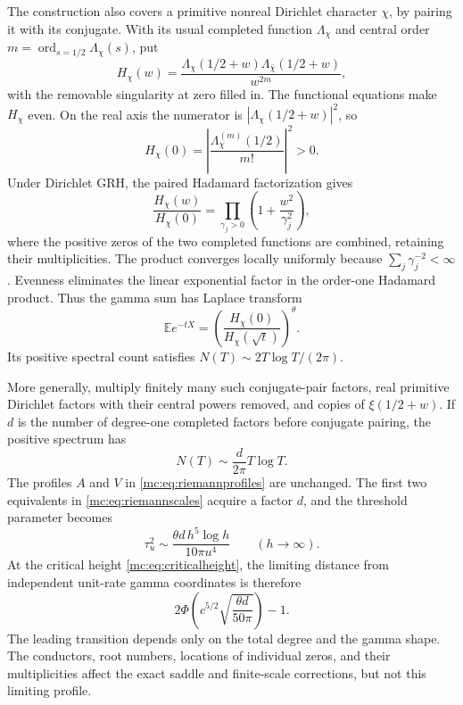 The construction also covers a primitive nonreal Dirichlet character
$\chi$, by pairing it with its conjugate.  With its usual completed
function $\Lambda_\chi$ and central order
$m=\operatorname{ord}_{s=1/2}\Lambda_\chi(s)$, put
\begin{equation}\label{mc:eq:complexproduct}
 H_\chi(w)=
 \frac{\Lambda_\chi(1/2+w)\Lambda_{\bar\chi}(1/2+w)}{w^{2m}},
\end{equation}
with the removable singularity at zero filled in.  The functional
equations make $H_\chi$ even.  On the real axis the numerator is
$|\Lambda_\chi(1/2+w)|^2$, so
\[
 H_\chi(0)=\left|\frac{\Lambda_\chi^{(m)}(1/2)}{m!}\right|^2>0.
\]
Under Dirichlet GRH, the paired Hadamard factorization gives
\[
 \frac{H_\chi(w)}{H_\chi(0)}
 =\prod_{\gamma_j>0}\left(1+\frac{w^2}{\gamma_j^2}\right),
\]
where the positive zeros of the two completed functions are combined,
retaining their multiplicities.  The product converges locally
uniformly because $\sum_j\gamma_j^{-2}<\infty$.  Evenness eliminates
the linear exponential factor in the order-one Hadamard product.
Thus the gamma sum has Laplace transform
\[
 \mathbb E e^{-tX}
 =\left(\frac{H_\chi(0)}{H_\chi(\sqrt t)}\right)^\theta.
\]
Its positive spectral count satisfies
$N(T)\sim2T\log T/(2\pi)$.

More generally, multiply finitely many such conjugate-pair factors,
real primitive Dirichlet factors with their central powers removed,
and copies of $\xi(1/2+w)$.  If $d$ is the number of degree-one
completed factors before conjugate pairing, the positive spectrum has
\[
 N(T)\sim\frac{d}{2\pi}T\log T.
\]
The profiles $A$ and $V$ in \eqref{mc:eq:riemannprofiles} are unchanged.
The first two equivalents in \eqref{mc:eq:riemannscales} acquire a
factor $d$, and the threshold parameter becomes
\[
 \tau_u^2\sim\frac{\theta d\,h^5\log h}{10\pi u^4}
 \qquad(h\to\infty).
\]
At the critical height \eqref{mc:eq:criticalheight}, the limiting
distance from independent unit-rate gamma coordinates is therefore
\begin{equation}\label{mc:eq:degreeprofile}
 2\Phi\left(c^{5/2}\sqrt{\frac{\theta d}{50\pi}}\right)-1.
\end{equation}
The leading transition depends only on the total degree and the gamma
shape.  The conductors, root numbers, locations of individual zeros,
and their multiplicities affect the exact saddle and finite-scale
corrections, but not this limiting profile.

